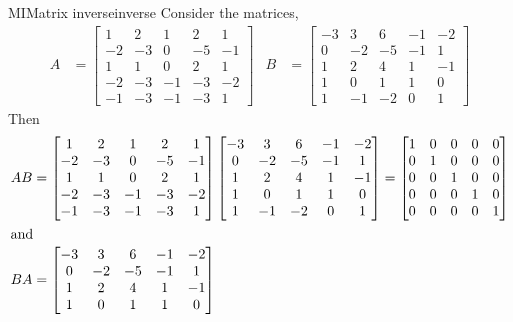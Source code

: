 %
\begin{example}{MI}{Matrix inverse}{inverse}
Consider the matrices,
%
\begin{align*}
A&=
\begin{bmatrix}
 1 & 2 & 1 & 2 & 1 \\
 -2 & -3 & 0 & -5 & -1 \\
 1 & 1 & 0 & 2 & 1 \\
 -2 & -3 & -1 & -3 & -2 \\
 -1 & -3 & -1 & -3 & 1
\end{bmatrix}
&
B&=
\begin{bmatrix}
 -3 & 3 & 6 & -1 & -2 \\
 0 & -2 & -5 & -1 & 1 \\
 1 & 2 & 4 & 1 & -1 \\
 1 & 0 & 1 & 1 & 0 \\
 1 & -1 & -2 & 0 & 1
\end{bmatrix}
\end{align*}
%
Then
%
\begin{align*}
AB
&=
\begin{bmatrix}
 1 & 2 & 1 & 2 & 1 \\
 -2 & -3 & 0 & -5 & -1 \\
 1 & 1 & 0 & 2 & 1 \\
 -2 & -3 & -1 & -3 & -2 \\
 -1 & -3 & -1 & -3 & 1
\end{bmatrix}
\begin{bmatrix}
 -3 & 3 & 6 & -1 & -2 \\
 0 & -2 & -5 & -1 & 1 \\
 1 & 2 & 4 & 1 & -1 \\
 1 & 0 & 1 & 1 & 0 \\
 1 & -1 & -2 & 0 & 1
\end{bmatrix}
=
\begin{bmatrix}
1 & 0 & 0 & 0 & 0\\
0 & 1 & 0 & 0 & 0\\
0 & 0 & 1 & 0 & 0\\
0 & 0 & 0 & 1 & 0\\
0 & 0 & 0 & 0 & 1
\end{bmatrix}\\
%
\intertext{and}
%
BA
&=
\begin{bmatrix}
 -3 & 3 & 6 & -1 & -2 \\
 0 & -2 & -5 & -1 & 1 \\
 1 & 2 & 4 & 1 & -1 \\
 1 & 0 & 1 & 1 & 0 \\

\end{bmatrix}
\end{align*}
\end{example}
